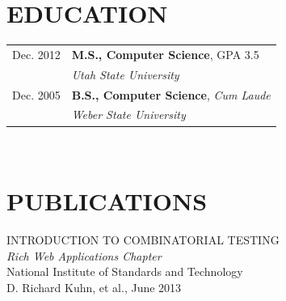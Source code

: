 \documentclass[letterpaper]{article}
\begin{document}
\begin{minipage}[t]{4.25in}
\section*{EDUCATION}

\begin{tabular}{rl}

Dec. 2012 
& \textbf{M.S., Computer Science}, GPA 3.5		\\ 
& \textit{Utah State University}				\\ [2ex]

Dec. 2005 
& \textbf{B.S., Computer Science}, \textit{Cum Laude} 	\\ 
& \textit{Weber State University}	\\
	 
\end{tabular}\\

\section*{PUBLICATIONS}
INTRODUCTION TO COMBINATORIAL TESTING \\
\textit{Rich Web Applications Chapter} \\
National Institute of Standards and Technology \\
D. Richard Kuhn, et al., June 2013
\end{minipage}
\end{document}
